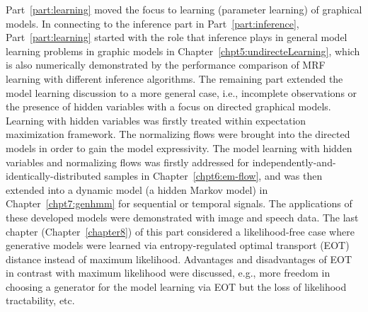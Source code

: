 Part~\ref{part:learning} moved the focus to learning (parameter learning) of graphical models. In connecting to the inference part in Part~\ref{part:inference}, Part~\ref{part:learning} started with the role that inference plays in general model learning problems in graphic models in Chapter~\ref{chpt5:undirecteLearning}, which is also numerically demonstrated by the performance comparison of MRF learning with different inference algorithms. The remaining part extended the model learning discussion to a more general case, i.e., incomplete observations or the presence of hidden variables with a focus on directed graphical models. Learning with hidden variables was firstly treated within expectation maximization framework. The normalizing flows were brought into the directed models in order to gain the model expressivity. The model learning with hidden variables and normalizing flows was firstly addressed for independently-and-identically-distributed samples in Chapter~\ref{chpt6:em-flow}, and was then extended into a dynamic model (a hidden Markov model) in Chapter~\ref{chpt7:genhmm} for sequential or temporal signals. The applications of these developed models were demonstrated with image and speech data. The last chapter (Chapter~\ref{chapter8}) of this part considered a likelihood-free case where generative models were learned via entropy-regulated optimal transport (EOT) distance instead of maximum likelihood. Advantages and disadvantages of EOT in contrast with maximum likelihood were discussed, e.g., more freedom in choosing a generator for the model learning via EOT but the loss of likelihood tractability, etc.

